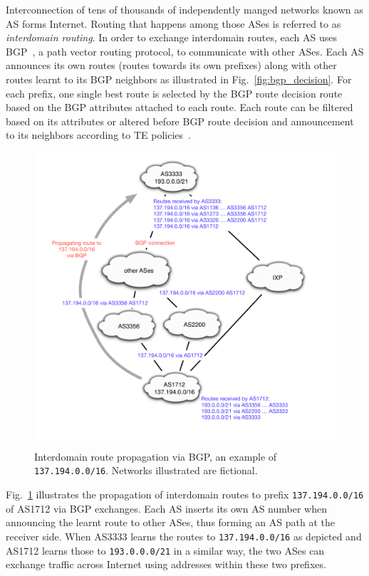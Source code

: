 Interconnection of tens of thousands of independently manged networks known as \acf{AS} forms Internet.
Routing that happens among those ASes is referred to as 
\textit{interdomain routing}.
In order to exchange interdomain routes, each AS uses \acf{BGP}~\cite{bgp4}, a path vector routing protocol, to communicate with other ASes.
Each AS announces its own routes (routes towards its own prefixes) along with other routes learnt to its BGP neighbors as illustrated in Fig.~\ref{fig:bgp_decision}.
For each prefix, one single best route is selected by the BGP route decision route based on the BGP attributes attached to each route.
Each route can be filtered based on its attributes or altered before BGP route decision and announcement to its neighbors according to \acf{TE} policies~\cite{Quoitin2003, Gao2001a}.

\begin{figure}[!htb]
\centering
\includegraphics[width=1.1\textwidth]{gfx/chap1/bgp_route_propagation.pdf}
\caption{Interdomain route propagation via \ac{BGP}, an example of \texttt{137.194.0.0/16}. Networks illustrated are fictional.}
\label{fig:bgp_propa}
\end{figure}

Fig.~\ref{fig:bgp_propa} illustrates the propagation of interdomain routes to prefix \texttt{137.194.0.0/16} of AS1712 via BGP exchanges. Each AS inserts its own AS number when announcing the learnt route to other ASes, thus forming an AS path at the receiver side. When AS3333 learns the routes to \texttt{137.194.0.0/16} as depicted and AS1712 learns those to \texttt{193.0.0.0/21} in a similar way, the two ASes can exchange traffic across Internet using addresses within these two prefixes.

